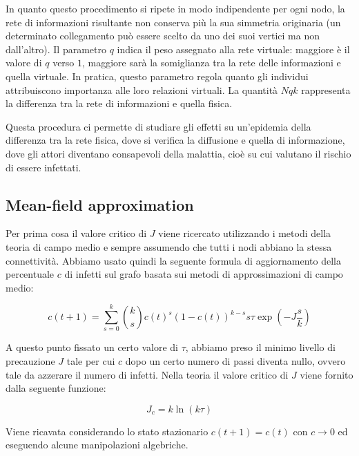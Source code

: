 In quanto questo procedimento si ripete in modo indipendente per ogni nodo, la rete di informazioni risultante non
conserva più la sua simmetria originaria (un determinato collegamento può essere scelto da uno dei suoi vertici ma non dall'altro).
Il parametro $q$ indica il peso assegnato alla rete virtuale: maggiore è il valore di $q$ verso $1$, maggiore sarà la
somiglianza tra la rete delle informazioni e quella virtuale.
In pratica, questo parametro regola quanto gli individui attribuiscono importanza alle loro relazioni virtuali.
La quantità $Nqk$ rappresenta la differenza tra la rete di informazioni e quella fisica.

Questa procedura ci permette di studiare gli effetti su un'epidemia della differenza tra la rete fisica, dove si verifica la
diffusione e quella di informazione, dove gli attori diventano consapevoli della malattia,
cioè su cui valutano il rischio di essere infettati.

\subsection{Mean-field approximation}\label{subsec:mean-field-approximation}
Per prima cosa il valore critico di $J$ viene ricercato utilizzando i metodi della teoria di campo medio e sempre assumendo
che tutti i nodi abbiano la stessa connettività.
Abbiamo usato quindi la seguente formula di aggiornamento della percentuale $c$ di infetti sul grafo basata
sui metodi di approssimazioni di campo medio:

\begin{equation}
    c(t+1)=\sum_{s=0}^{k}\binom{k}{s}c(t)^{s}(1-c(t))^{k-s}s\tau\exp\left(-J\frac{s}{k}\right)\label{eq:mean-field}
\end{equation}

A questo punto fissato un certo valore di $\tau$, abbiamo preso il minimo livello di precauzione $J$ tale per cui $c$ dopo un
certo numero di passi diventa nullo, ovvero tale da azzerare il numero di infetti. 
Nella teoria il valore critico di $J$ viene fornito dalla seguente funzione:

\begin{equation}
    J_{c}=k\ln(k\tau)\label{eq:mean-field-critical}
\end{equation}

Viene ricavata considerando lo stato stazionario $c(t+1)=c(t)$ con $c\to0$ ed eseguendo alcune manipolazioni algebriche.

